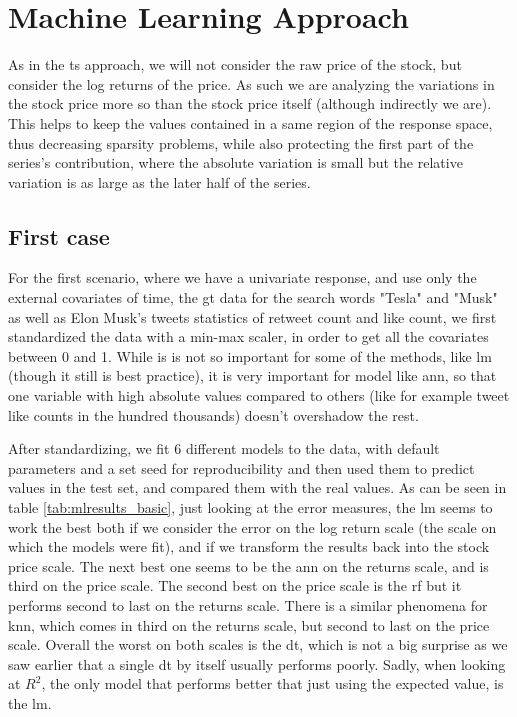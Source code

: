 \section{Machine Learning Approach}
As in the \acrshort{ts} approach, we will not consider the raw price of the stock, but consider the log returns of the price. As such we are analyzing the variations in the stock price more so than the stock price itself (although indirectly we are). This helps to keep the values contained in a same region of the response space, thus decreasing sparsity problems, while also protecting the first part of the series's contribution, where the absolute variation is small but the relative variation is as large as the later half of the series.

\subsection{First case}

For the first scenario,  where we have a univariate response, and use only the external covariates of time, the \acrlong{gt} data for the search words "Tesla" and "Musk" as well as Elon Musk's tweets statistics of retweet count and like count, we first standardized the data with a min-max scaler, in order to get all the covariates between 0 and 1. While is is not so important for some of the methods, like \acrlong{lm} (though it still is best practice), it is very important for model like \acrshort{ann}, so that one variable with high absolute values compared to others (like for example tweet like counts in the hundred thousands) doesn't overshadow the rest.



After standardizing, we fit 6 different models to the data, with default parameters and a set seed for reproducibility and then used them to predict values in the test set, and compared them with the real values. As can be seen in table \ref{tab:mlresults_basic}, just looking at the error measures, the \acrlong{lm} seems to work the best both if we consider the error on the log return scale (the scale on which the models were fit), and if we transform the results back into the stock price scale. The next best one seems to be the \acrlong{ann} on the returns scale, and is third on the price scale. The second best on the price scale is the \acrlong{rf}  but it performs second to last on the returns scale. There is a similar phenomena for \acrshort{knn}, which comes in third on the returns scale, but second to last on the price scale. Overall the worst on both scales is the \acrlong{dt}, which is not a big surprise as we saw earlier that a single \acrshort{dt} by itself usually performs poorly. Sadly, when looking at $R^2$, the only model that performs better that just using the expected value, is the \acrlong{lm}. 

